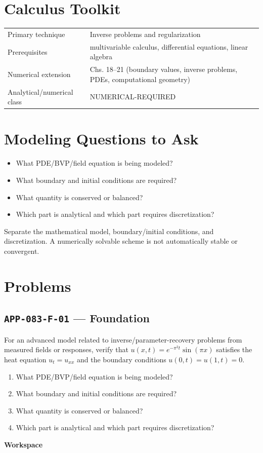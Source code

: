 \documentclass[11pt]{book}
\newcommand{\pid}[1]{\texttt{#1}}
\newcommand{\workspace}{\par\vspace{0.7in}\hrulefill\par\vspace{0.55in}\hrulefill\par}
\begin{document}
\section*{Calculus Toolkit}
\begin{tabularx}{\textwidth}{@{}lX@{}}\toprule
Primary technique & Inverse problems and regularization \\
Prerequisites & multivariable calculus, differential equations, linear algebra \\
Numerical extension & Chs. 18–21 (boundary values, inverse problems, PDEs, computational geometry) \\
Analytical/numerical class & NUMERICAL-REQUIRED \\
\bottomrule\end{tabularx}
\section*{Modeling Questions to Ask}\begin{itemize}
\item What PDE/BVP/field equation is being modeled?
\item What boundary and initial conditions are required?
\item What quantity is conserved or balanced?
\item Which part is analytical and which part requires discretization?
\end{itemize}
\begin{errorbox}Separate the mathematical model, boundary/initial conditions, and discretization. A numerically solvable scheme is not automatically stable or convergent.\end{errorbox}
\section*{Problems}
\subsection*{\pid{APP-083-F-01} — Foundation}
\begin{problembox}
For an advanced model related to inverse/parameter-recovery problems from measured fields or responses, verify that $u(x,t)=e^{-\pi^2t}\sin(\pi x)$ satisfies the heat equation $u_t=u_{xx}$ and the boundary conditions $u(0,t)=u(1,t)=0$.
\end{problembox}
\begin{promptbox}\begin{enumerate}
\item What PDE/BVP/field equation is being modeled?
\item What boundary and initial conditions are required?
\item What quantity is conserved or balanced?
\item Which part is analytical and which part requires discretization?
\end{enumerate}\end{promptbox}
\textbf{Workspace}\workspace
{}
\end{document}
